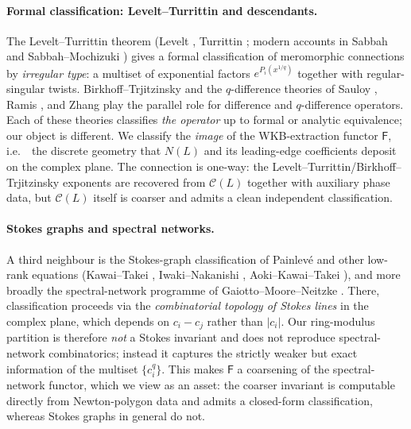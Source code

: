\documentclass[11pt,a4paper]{article}
\theoremstyle{plain}
\theoremstyle{definition}
\theoremstyle{remark}
\newcommand{\NL}{N(L)}
\newcommand{\Cl}{\mathcal{C}}
\newcommand{\Fclass}{\mathsf{F}}
\newcommand{\ie}{i.e.\ }
\begin{document}
\paragraph{Formal classification: Levelt--Turrittin and descendants.}
The Levelt--Turrittin theorem (Levelt \cite{levelt}, Turrittin
\cite{turrittin}; modern accounts in Sabbah \cite{sabbah-isomon} and
Sabbah--Mochizuki \cite{mochizuki-asymptotic}) gives a formal
classification of meromorphic connections by \emph{irregular type}: a
multiset of exponential factors $e^{P_i(x^{1/q})}$ together with
regular-singular twists. Birkhoff--Trjitzinsky \cite{birkhoff-trjitzinsky}
and the $q$-difference theories of Sauloy \cite{sauloy}, Ramis
\cite{ramis-stokes,ramis-q-stokes}, and Zhang \cite{zhang} play the
parallel role for difference and $q$-difference operators. Each of these
theories classifies \emph{the operator} up to formal or analytic
equivalence; our object is different. We classify the \emph{image} of
the WKB-extraction functor $\Fclass$, \ie\ the discrete geometry that
$\NL$ and its leading-edge coefficients deposit on the complex plane.
The connection is one-way: the Levelt--Turrittin/Birkhoff--Trjitzinsky
exponents are recovered from $\Cl(L)$ together with auxiliary phase data,
but $\Cl(L)$ itself is coarser and admits a clean independent
classification.

\paragraph{Stokes graphs and spectral networks.}
A third neighbour is the Stokes-graph classification of Painlev{\'e} and
other low-rank equations (Kawai--Takei \cite{kawai-takei},
Iwaki--Nakanishi \cite{iwaki-nakanishi}, Aoki--Kawai--Takei
\cite{aoki-kawai-takei}), and more broadly the spectral-network programme
of Gaiotto--Moore--Neitzke \cite{gmn-spectral}. There, classification
proceeds via the \emph{combinatorial topology of Stokes lines} in the
complex plane, which depends on $c_i - c_j$ rather than $|c_i|$. Our
ring-modulus partition is therefore \emph{not} a Stokes invariant and
does not reproduce spectral-network combinatorics; instead it captures
the strictly weaker but exact information of the multiset $\{c_i^q\}$.
This makes $\Fclass$ a coarsening of the spectral-network functor, which
we view as an asset: the coarser invariant is computable directly from
Newton-polygon data and admits a closed-form classification, whereas
Stokes graphs in general do not.
\end{document}
